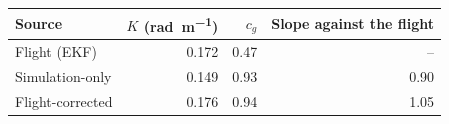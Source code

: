 \begin{tabular}{lrrr}
\toprule
Source & $K$ (\si{\radian\per\metre}) & $c_g$ & Slope against the flight \\
\midrule
Flight (EKF) & 0.172 & 0.47 & -- \\
Simulation-only & 0.149 & 0.93 & 0.90 \\
Flight-corrected & 0.176 & 0.94 & 1.05 \\
\bottomrule
\end{tabular}
